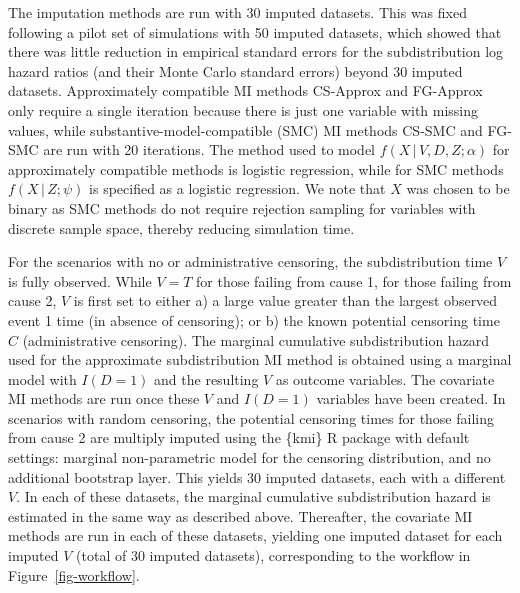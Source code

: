 \documentclass[
  letterpaper,
  paper=240mm:170mm,
  twoside=true,
  open=right,
  fontsize=10pt,
  pagesize=false,
  BCOR=15mm,
  DIV=14,
  headinclude=true,
  footinclude=false,
  headsepline=on]{scrbook}
\newcommand{\given}{\,|\,}
\begin{document}
The imputation methods are run with 30 imputed datasets. This was fixed
following a pilot set of simulations with 50 imputed datasets, which
showed that there was little reduction in empirical standard errors for
the subdistribution log hazard ratios (and their Monte Carlo standard
errors) beyond 30 imputed datasets. Approximately compatible MI methods
CS-Approx and FG-Approx only require a single iteration because there is
just one variable with missing values, while
substantive-model-compatible (SMC) MI methods CS-SMC and FG-SMC are run
with 20 iterations. The method used to model
\(f(X \given V, D, Z;\alpha)\) for approximately compatible methods is
logistic regression, while for SMC methods \(f(X \given Z;\psi)\) is
specified as a logistic regression. We note that \(X\) was chosen to be
binary as SMC methods do not require rejection sampling for variables
with discrete sample space, thereby reducing simulation time.

For the scenarios with no or administrative censoring, the
subdistribution time \(V\) is fully observed. While \(V = T\) for those
failing from cause 1, for those failing from cause 2, \(V\) is first set
to either a) a large value greater than the largest observed event 1
time (in absence of censoring); or b) the known potential censoring time
\(C\) (administrative censoring). The marginal cumulative
subdistribution hazard used for the approximate subdistribution MI
method is obtained using a marginal model with \(I(D=1)\) and the
resulting \(V\) as outcome variables. The covariate MI methods are run
once these \(V\) and \(I(D=1)\) variables have been created. In
scenarios with random censoring, the potential censoring times for those
failing from cause 2 are multiply imputed using the \{kmi\} R package
with default settings: marginal non-parametric model for the censoring
distribution, and no additional bootstrap layer. This yields 30 imputed
datasets, each with a different \(V\). In each of these datasets, the
marginal cumulative subdistribution hazard is estimated in the same way
as described above. Thereafter, the covariate MI methods are run in each
of these datasets, yielding one imputed dataset for each imputed \(V\)
(total of 30 imputed datasets), corresponding to the workflow in
Figure~\ref{fig-workflow}.
\end{document}
